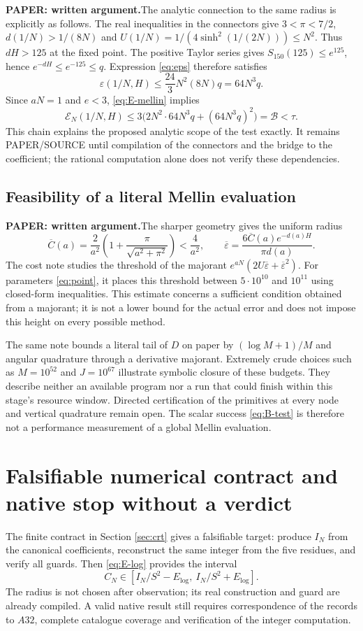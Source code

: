 \documentclass[11pt,a4paper]{article}
\theoremstyle{remark}
\newcommand{\paper}{\textbf{PAPER: written argument.}\space}
\begin{document}
\paper The analytic connection to the same radius is explicitly as follows.
The real inequalities in the connectors give $3<\pi<7/2$,
$d(1/N)>1/(8N)$ and
$U(1/N)=1/(4\sinh^2(1/(2N)))\le N^2$.
Thus $dH>125$ at the fixed point. The positive Taylor series gives
$S_{150}(125)\le e^{125}$, hence $e^{-dH}\le e^{-125}\le q$.
Expression \eqref{eq:eps} therefore satisfies
\[
\varepsilon(1/N,H)\le
\frac{24}{3}N^2(8N)q=64N^3q.
\]
Since $aN=1$ and $e<3$, \eqref{eq:E-mellin} implies
\[
\mathcal E_N(1/N,H)\le
3\bigl(2N^2\cdot64N^3q+(64N^3q)^2\bigr)=\mathcal B<\tau.
\]
This chain explains the proposed analytic scope of the test exactly.
It remains PAPER/SOURCE until compilation of the connectors and the bridge
to the coefficient; the rational computation alone does not verify
these dependencies.

\subsection*{Feasibility of a literal Mellin evaluation}
\paper The sharper geometry gives the uniform radius
\[
\overline C(a)=\frac2{a^2}\left(1+
\frac{\pi}{\sqrt{a^2+\pi^2}}\right)<\frac4{a^2},\qquad
\overline\varepsilon=
\frac{6\overline C(a)e^{-d(a)H}}{\pi d(a)}.
\]
The cost note studies the threshold of the majorant
$e^{aN}(2U\overline\varepsilon+\overline\varepsilon^2)$.
For parameters \eqref{eq:point}, it places this threshold between
$5\cdot10^{10}$ and $10^{11}$ using closed-form inequalities.
This estimate concerns a sufficient condition obtained from a majorant;
it is not a lower bound for the actual error and does not impose this
height on every possible method.

The same note bounds a literal tail of $D$ on paper by $(\log M+1)/M$
and angular quadrature through a derivative majorant. Extremely crude
choices such as $M=10^{52}$ and $J=10^{67}$ illustrate symbolic closure
of these budgets. They describe neither an available program nor a run
that could finish within this stage's resource window. Directed certification
of the primitives at every node and vertical quadrature remain open.
The scalar success \eqref{eq:B-test} is therefore not a performance
measurement of a global Mellin evaluation.

\clearpage
\section{Falsifiable numerical contract and native stop without a verdict}\label{sec:numeric}
The finite contract in Section \ref{sec:crt} gives a falsifiable target:
produce $I_N$ from the canonical coefficients, reconstruct the same integer
from the five residues, and verify all guards. Then \eqref{eq:E-log}
provides the interval
\[
C_N\in\left[I_N/S^2-E_{\log},\ I_N/S^2+E_{\log}\right].
\]
The radius is not chosen after observation; its real construction and guard
are already compiled. A valid native result still requires correspondence
of the records to $A32$, complete catalogue coverage and verification
of the integer computation.
\end{document}
